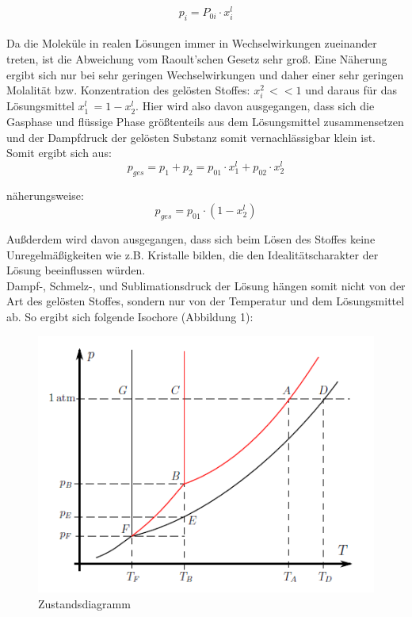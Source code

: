 \documentclass[12pt,a4paper,titlepage,headinclude,bibtotoc]{scrartcl}
\begin{document}
\begin{equation}
p_i = P_{0i} \cdot x_i^{l}
\end{equation}
\\

Da die Moleküle in realen Lösungen immer in Wechselwirkungen zueinander treten, ist die Abweichung vom Raoult'schen Gesetz sehr groß. Eine Näherung ergibt sich nur bei sehr geringen Wechselwirkungen und daher einer sehr geringen Molalität bzw. Konzentration des gelösten Stoffes: $x_i^2\,<<1$ und daraus für das Lösungsmittel $x_1^l\,= 1 - x_2^l$. Hier wird also davon ausgegangen, dass sich die Gasphase und flüssige Phase größtenteils aus dem Lösungsmittel zusammensetzen und der Dampfdruck der gelösten Substanz somit vernachlässigbar klein ist. Somit ergibt sich aus: \\

\begin{equation}
p_{ges} = p_1 + p_2 = p_{01} \cdot x_1^l + p_{02} \cdot x_2^l
\end{equation}

näherungsweise:
\begin{equation}
p_{ges} = p_{01} \cdot (1-x_2^l)
\end{equation}

Außderdem wird davon ausgegangen, dass sich beim Lösen des Stoffes keine Unregelmäßigkeiten wie z.B. Kristalle bilden, die den Idealitätscharakter der Lösung beeinflussen würden.\\

Dampf-, Schmelz-, und Sublimationsdruck der Lösung hängen somit nicht von der Art des gelösten Stoffes, sondern nur von der Temperatur und dem Lösungsmittel ab. So ergibt sich folgende Isochore (Abbildung 1):\\

\newpage

\begin{figure} [h!]
\begin{center}
\includegraphics[scale=1]{Phasendiagramm.png} \end{center}
\caption {Zustandsdiagramm \protect\footnotemark}
\end{figure}
\end{document}
